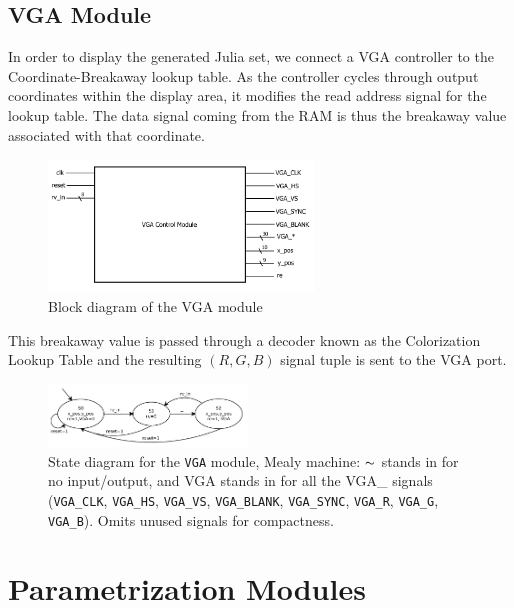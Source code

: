 \documentclass{article}
\begin{document}
\subsection{VGA Module}

In order to display the generated Julia set, we connect a VGA controller 
 to the Coordinate-Breakaway lookup table. As the controller cycles
through output coordinates within the display area, it modifies the
read address signal for the lookup table. The data signal coming from
the RAM is thus the breakaway value associated with that coordinate.

\begin{figure}[H]
  \centering
    \includegraphics[width=200pt]{block_diagrams/vga.pdf}
  \caption{Block diagram of the VGA module}
\end{figure}

This breakaway value is passed through a decoder known as the
Colorization Lookup Table and the resulting $(R, G, B)$ signal tuple
is sent to the VGA port.



\begin{figure}[H]
  \centering
    \includegraphics[width=200px]{state_diagrams/vga.pdf}
  \caption{State diagram for the \texttt{VGA} module, Mealy machine: $\thicksim$
    stands in for no input/output, and VGA stands in for all the VGA\_
    signals (\texttt{VGA\_CLK}, \texttt{VGA\_HS}, \texttt{VGA\_VS},
    \texttt{VGA\_BLANK}, \texttt{VGA\_SYNC}, \texttt{VGA\_R}, \texttt{VGA\_G},
    \texttt{VGA\_B}). Omits unused signals for compactness.}
\end{figure}


\section{Parametrization Modules}
\end{document}
